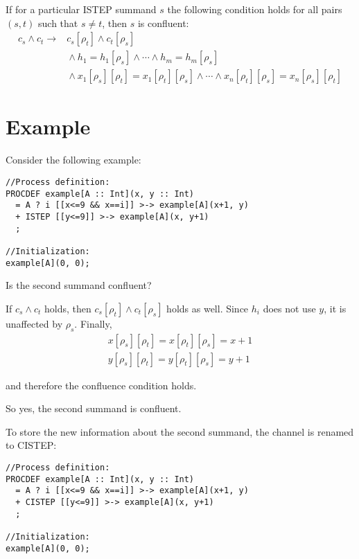 If for a particular ISTEP summand $s$ the following condition holds for all pairs $(s, t)$ such that $s \neq t$, then $s$ is confluent:
\begin{align*}
c_s \land c_t \rightarrow{} &c_s[\rho_t] \land c_t[\rho_s] \\
&{} \land h_1 = h_1[\rho_s] \land \cdots{} \land h_m = h_m[\rho_s] \\
&{} \land x_1[\rho_s][\rho_t] = x_1[\rho_t][\rho_s] \land \cdots{} \land x_n[\rho_t][\rho_s] = x_n[\rho_s][\rho_t]
\end{align*}

\section{Example}

Consider the following example:

\begin{lstlisting}
//Process definition:
PROCDEF example[A :: Int](x, y :: Int)
  = A ? i [[x<=9 && x==i]] >-> example[A](x+1, y)
  + ISTEP [[y<=9]] >-> example[A](x, y+1)
  ;

//Initialization:
example[A](0, 0);
\end{lstlisting}

Is the second summand confluent?

If $c_s \land c_t$ holds, then $c_s[\rho_t] \land c_t[\rho_s]$ holds as well.
Since $h_i$ does not use $y$, it is unaffected by $\rho_s$.
Finally,
\begin{align*}
x[\rho_s][\rho_t] = x[\rho_t][\rho_s] = x+1 \\
y[\rho_s][\rho_t] = y[\rho_t][\rho_s] = y+1
\end{align*}

and therefore the confluence condition holds.

So yes, the second summand is confluent.

To store the new information about the second summand, the channel is renamed to CISTEP:

\begin{lstlisting}
//Process definition:
PROCDEF example[A :: Int](x, y :: Int)
  = A ? i [[x<=9 && x==i]] >-> example[A](x+1, y)
  + CISTEP [[y<=9]] >-> example[A](x, y+1)
  ;

//Initialization:
example[A](0, 0);
\end{lstlisting}

